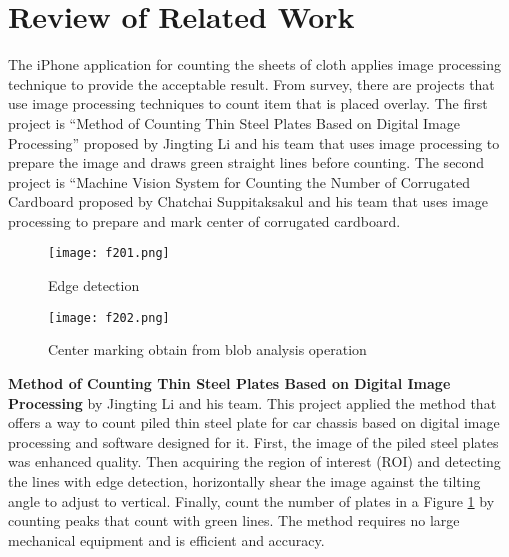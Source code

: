 \section{Review of Related Work}
The iPhone application for counting the sheets of cloth applies image processing technique to provide the acceptable result. From survey, there are projects that use image processing techniques to count item that is placed overlay. The first project is “Method of Counting Thin Steel Plates Based on Digital Image Processing” proposed by Jingting Li and his team\cite{Method} that uses image processing to prepare the image and draws green straight lines before counting. The second project is “Machine Vision System for Counting the Number of Corrugated Cardboard proposed by Chatchai Suppitaksakul and his team \cite{Machine} that uses image processing to prepare and mark center of corrugated cardboard.\\
\begin{figure}[t]
	\centering
	\texttt{[image: f201.png]}
	\caption{Edge detection}
	\label{fig:f201}
\end{figure}
\begin{figure}[t]
	\centering
	\texttt{[image: f202.png]}
	\caption{Center marking obtain from blob analysis operation}
	\label{fig:f202}
\end{figure}

\textbf{Method of Counting Thin Steel Plates Based on Digital Image Processing}
by Jingting Li and his team.\cite{Method} This project applied the method that offers a way to count piled thin steel plate for car chassis based on digital image processing and software designed for it. First, the image of the piled steel plates was enhanced quality. Then acquiring the region of interest (ROI) and detecting the lines with edge detection, horizontally shear the image against the tilting angle to adjust to vertical. Finally, count the number of plates in a Figure \ref{fig:f201} by counting peaks that count with green lines. The method requires no large mechanical equipment and is efficient and accuracy.\\

